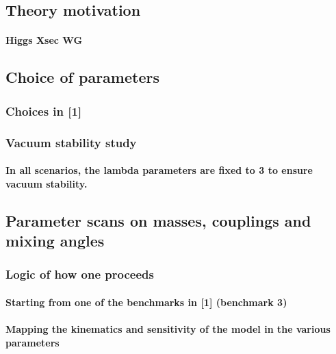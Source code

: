 






\subsection{Theory motivation}


\paragraph{Higgs Xsec WG}

\subsection{Choice of parameters}

\subsubsection{Choices in {[}1{]}}

\subsubsection{Vacuum stability study}

\paragraph{In all scenarios, the lambda parameters are fixed to 3 to
ensure vacuum stability.}

\subsection{Parameter scans on masses, couplings and mixing angles}

\subsubsection{Logic of how one proceeds}

\paragraph{Starting from one of the benchmarks in {[}1{]} (benchmark 3)}

\paragraph{Mapping the kinematics and sensitivity of the model in the
various parameters}

